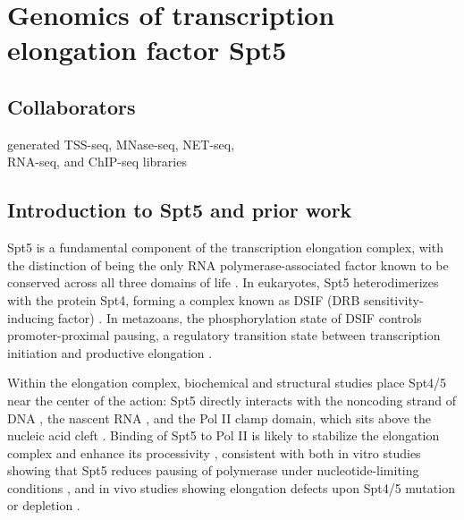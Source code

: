 \chapter{Genomics of transcription elongation factor Spt5}
\label{chapter:five}

\section{Collaborators}

\begin{description}[align=right, leftmargin=!, labelwidth=5cm, noitemsep]
    \item [Ameet Shetty] generated TSS-seq, MNase-seq, NET-seq,\\RNA-seq, and ChIP-seq libraries
\end{description}

\section{Introduction to Spt5 and prior work}

Spt5 is a fundamental component of the transcription elongation complex, with the distinction of being the only RNA polymerase-associated factor known to be conserved across all three domains of life \citep{hartzog2013, werner2012}.
In eukaryotes, Spt5 heterodimerizes with the protein Spt4, forming a complex known as DSIF (DRB sensitivity-inducing factor) \citep{hartzog1998,hirtreiter2010,schwer2009,wada1998}.
In metazoans, the phosphorylation state of DSIF controls promoter-proximal pausing, a regulatory transition state between transcription initiation and productive elongation \citep{adelman2012}.

Within the elongation complex, biochemical and structural studies place Spt4/5 near the center of the action: Spt5 directly interacts with the noncoding strand of DNA \citep{crickard2016,meyer2015}, the nascent RNA \citep{blythe2016, crickard2016,meyer2015}, and the Pol II clamp domain, which sits above the nucleic acid cleft \citep{hirtreiter2010, martinez-rucobo2011, viktorovskaya2011, yamaguchi1999}.
Binding of Spt5 to Pol II is likely to stabilize the elongation complex and enhance its processivity \citep{hirtreiter2010,klein2011,martinez-rucobo2011}, consistent with both in vitro studies showing that Spt5 reduces pausing of polymerase under nucleotide-limiting conditions \citep{guo2000,wada1998,zhu2007}, and in vivo studies showing elongation defects upon Spt4/5 mutation or depletion \citep{diamant2016,kramer2016,liu2012,mason2005,morillon2003,quan2010,rondon2003}.

